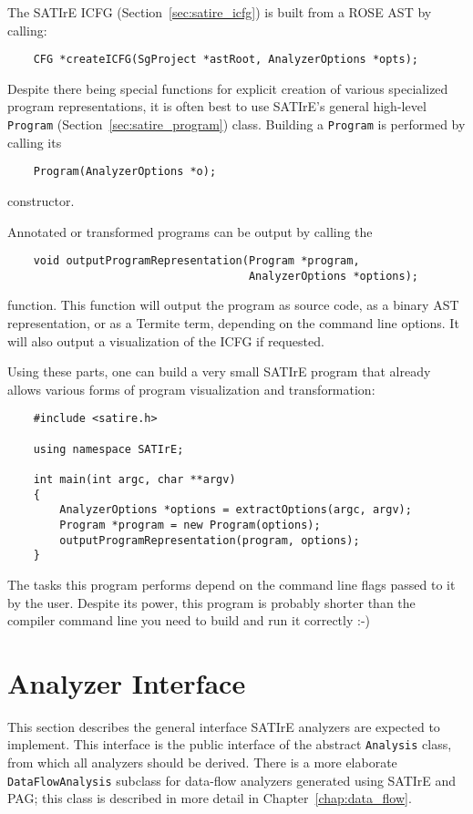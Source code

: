 \documentclass[a4paper,12pt]{report}
\begin{document}
The SATIrE ICFG (Section~\ref{sec:satire_icfg}) is built from a
ROSE AST by calling:
\begin{verbatim}
    CFG *createICFG(SgProject *astRoot, AnalyzerOptions *opts);
\end{verbatim}

Despite there being special functions for explicit creation of various
specialized program representations, it is often best to use SATIrE's
general high-level \texttt{Program} (Section~\ref{sec:satire_program})
class. Building a \texttt{Program} is performed by calling its
\begin{verbatim}
    Program(AnalyzerOptions *o);
\end{verbatim}
constructor.

Annotated or transformed programs can be output by calling the
\begin{verbatim}
    void outputProgramRepresentation(Program *program,
                                     AnalyzerOptions *options);
\end{verbatim}
function. This function will output the program as source code, as a binary
AST representation, or as a Termite term, depending on the command line
options. It will also output a visualization of the ICFG if requested.

Using these parts, one can build a very small SATIrE program that already
allows various forms of program visualization and transformation:
\begin{verbatim}
    #include <satire.h>

    using namespace SATIrE;

    int main(int argc, char **argv)
    {
        AnalyzerOptions *options = extractOptions(argc, argv);
        Program *program = new Program(options);
        outputProgramRepresentation(program, options);
    }
\end{verbatim}

The tasks this program performs depend on the command line flags passed to
it by the user. Despite its power, this program is probably shorter than the
compiler command line you need to build and run it correctly :-)

\section{Analyzer Interface}
\label{sec:analyzer_interface}

This section describes the general interface SATIrE analyzers are expected
to implement. This interface is the public interface of the abstract
\texttt{Analysis} class, from which all analyzers should be derived. There
is a more elaborate \texttt{DataFlowAnalysis} subclass for data-flow
analyzers generated using SATIrE and PAG; this class is described in more
detail in Chapter~\ref{chap:data_flow}.
\end{document}

